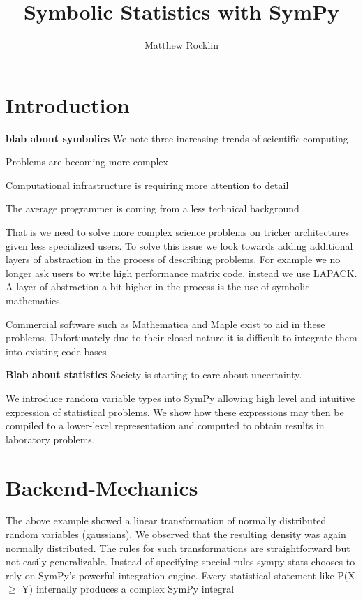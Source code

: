 \documentclass[11pt, a4paper, english]{article}
\title{Symbolic Statistics with SymPy}
\author{Matthew Rocklin}
\date{}
\begin{document}
\maketitle

\section{Introduction}

{\bf blab about symbolics}
We note three increasing trends of scientific computing
\begin{enumerate*}
\item Problems are becoming more complex
\item Computational infrastructure is requiring more attention to detail
\item The average programmer is coming from a less technical background
\end{enumerate*}

That is we need to solve more complex science problems on tricker architectures given less specialized users. To solve this issue we look towards adding additional layers of abstraction in the process of describing problems. For example we no longer ask users to write high performance matrix code, instead we use LAPACK. A layer of abstraction a bit higher in the process is the use of symbolic mathematics.

Commercial software such as Mathematica and Maple exist to aid in these problems. Unfortunately due to their closed nature it is difficult to integrate them into existing code bases. 

{\bf Blab about statistics}
Society is starting to care about uncertainty. 

We introduce random variable types into SymPy allowing high level and intuitive expression of statistical problems. We show how these expressions may then be compiled to a lower-level representation and computed to obtain results in laboratory problems. 



\section{Backend-Mechanics}
The above example showed a linear transformation of normally distributed random variables (gaussians). We observed that the resulting density was again normally distributed. The rules for such transformations are straightforward but not easily generalizable. Instead of specifying special rules sympy-stats chooses to rely on SymPy's powerful integration engine. Every statistical statement like P(X $\ge$ Y) internally produces a complex SymPy integral
\end{document}
